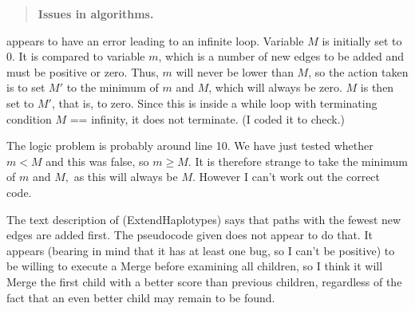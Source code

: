 
\begin{quote} %
\textbf{Issues in algorithms.}
\end{quote}

\begin{point}{}
 appears to have an error leading to an infinite
loop. Variable $M$ is initially set to 0. It is compared to variable $m$,
which is a number of new edges to be added and must be positive or zero.
Thus, $m$ will never be lower than $M$, so the action taken is to set $M'$ to
the minimum of $m$ and $M$, which will always be zero. $M$ is then set to
$M'$, that is, to zero. Since this is inside a while loop with terminating
condition $M$ == infinity, it does not terminate. (I coded it to check.)

The logic problem is probably around line 10. We have just tested
whether $m < M$ and this was false, so $m \ge M$. It is therefore
strange to take the minimum of $m$ and $M,$ as this will always be
$M$. However I can't work out the correct code.
\end{point}


\begin{point}{}
The text description of  (ExtendHaplotypes) says that
paths with the fewest new edges are added first. The pseudocode
given does not appear to do that. It appears (bearing in mind that
it has at least one bug, so I can't be positive) to be willing to
execute a Merge before examining all children, so I think it will
Merge the first child with a better score than previous children,
regardless of the fact that an even better child may remain to be
found.
\end{point}

